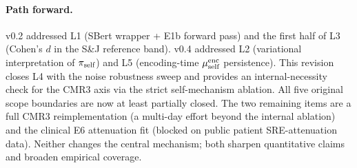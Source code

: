 \paragraph{Path forward.}
v0.2 addressed L1 (SBert wrapper + E1b forward pass) and the first
half of L3 (Cohen's $d$ in the S\&J reference band). v0.4 addressed
L2 (variational interpretation of $\pi_{\text{self}}$) and L5 (encoding-time
$\mu_{\text{self}}^{\text{enc}}$ persistence). This revision closes L4 with
the noise robustness sweep and provides an internal-necessity check
for the CMR3 axis via the strict self-mechanism ablation. All five
original scope boundaries are now at least partially closed. The two
remaining items are a full CMR3 reimplementation (a multi-day effort
beyond the internal ablation) and the clinical E6 attenuation fit
(blocked on public patient SRE-attenuation data).
Neither changes the central mechanism; both sharpen quantitative
claims and broaden empirical coverage.
